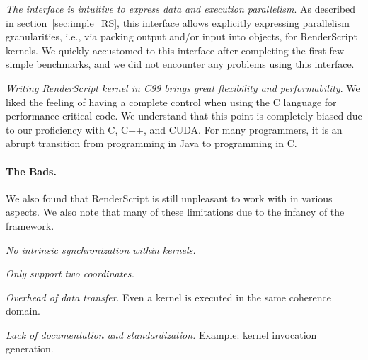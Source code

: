 \textit{The  interface is intuitive to express data and
execution parallelism}. As described in section~\ref{sec:imple_RS}, this
 interface allows explicitly expressing parallelism
granularities, i.e., via packing output and/or input into  objects,
for RenderScript kernels.  We quickly accustomed to this interface
after completing the first few simple benchmarks, and we did not encounter
any problems using this interface.

\textit{Writing RenderScript kernel in C99 brings great flexibility and
performability}. We liked the feeling of having a complete control when using
the C language for performance critical code. We understand that this point is
completely biased due to our proficiency with C, C++, and CUDA. For many
programmers, it is an abrupt transition from programming in Java to programming
in C.


\paragraph{The Bads.} We also found that RenderScript is still unpleasant to work
with in various aspects. We also note that many of these limitations due to the
infancy of the framework.

\textit{No intrinsic synchronization within kernels.}

\textit{Only support two coordinates.}

\textit{Overhead of data transfer}. Even a kernel is executed in the same
coherence domain.

\textit{Lack of documentation and standardization.} Example: kernel invocation generation.


